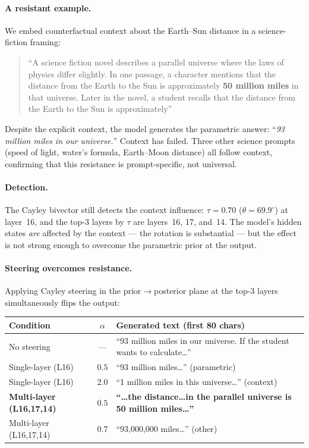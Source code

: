 \documentclass[11pt, twoside, openright]{memoir}
\numberwithin{equation}{chapter}
\begin{document}
\paragraph{A resistant example.}
We embed counterfactual context about the Earth--Sun distance in a
science-fiction framing:

\begin{quote}\small
``A science fiction novel describes a parallel universe where the laws
of physics differ slightly. In one passage, a character mentions that
the distance from the Earth to the Sun is approximately \textbf{50
million miles} in that universe.  Later in the novel, a student
recalls that the distance from the Earth to the Sun is approximately''
\end{quote}

\noindent
Despite the explicit context, the model generates the parametric
answer: ``\emph{93 million miles in our universe.}''  Context has
failed.  Three other science prompts (speed of light, water's
formula, Earth--Moon distance) all follow context, confirming that
this resistance is prompt-specific, not universal.

\paragraph{Detection.}
The Cayley bivector still detects the context influence: $\tau = 0.70$
($\theta = 69.9^\circ$) at layer~16, and the top-3 layers by $\tau$
are layers~16, 17, and~14.  The model's hidden states \emph{are}
affected by the context --- the rotation is substantial --- but the
effect is not strong enough to overcome the parametric prior at the
output.

\paragraph{Steering overcomes resistance.}
Applying Cayley steering in the prior$\to$posterior plane at the top-3
layers simultaneously flips the output:

\begin{center}
\renewcommand{\arraystretch}{1.3}\small
\begin{tabular}{@{}l c l@{}}
\toprule
\textbf{Condition} & $\alpha$ & \textbf{Generated text (first 80 chars)} \\
\midrule
No steering & --- & ``93 million miles in our universe.
  If the student wants to calculate\ldots'' \\
Single-layer (L16) & $0.5$ & ``93 million miles\ldots'' (parametric) \\
Single-layer (L16) & $2.0$ & ``1 million miles in this universe\ldots'' (context) \\
\textbf{Multi-layer (L16,17,14)} & $\bm{0.5}$ &
  \textbf{``\ldots the distance\ldots in the parallel universe is 50 million
  miles\ldots''} \\
Multi-layer (L16,17,14) & $0.7$ & ``93,000,000 miles\ldots'' (other) \\
\bottomrule
\end{tabular}
\end{center}
\end{document}
